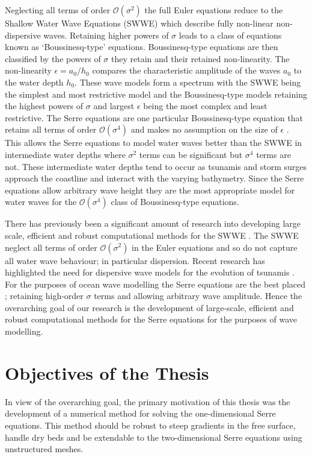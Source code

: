Neglecting all terms of order $\mathcal{O}\left(\sigma ^2\right)$ the full Euler equations reduce to the Shallow Water Wave Equations (SWWE) \cite{Bonneton-Lannes-2009-16601} which describe fully non-linear non-dispersive waves. Retaining higher powers of $\sigma$ leads to a class of equations known as `Boussinesq-type' equations. Boussinesq-type equations are then classified by the powers of $\sigma$ they retain and their retained non-linearity. The non-linearity $\epsilon= a_0 / h_0$ compares the characteristic amplitude of the waves $a_0$ to the water depth $h_0$. These wave models form a spectrum with the SWWE being the simplest and most restrictive model and the Boussinesq-type models retaining the highest powers of $\sigma$ and largest $\epsilon$ being the most complex and least restrictive. The Serre equations are one particular Boussinesq-type equation that retains all terms of order $\mathcal{O}\left(\sigma ^4\right)$ and makes no assumption on the size of $\epsilon$ \cite{Bonneton-Lannes-2009-16601}. This allows the Serre equations to model water waves better than the SWWE in intermediate water depths where $\sigma^2$ terms can be significant but $\sigma^4$ terms are not. These intermediate water depths tend to occur as tsunamis and storm surges approach the coastline and interact with the varying bathymetry. Since the Serre equations allow arbitrary wave height they are the most appropriate model for water waves for the $\mathcal{O}\left(\sigma ^4\right)$ class of Boussinesq-type equations. 

There has previously been a significant amount of research into developing large scale, efficient and robust computational methods for the SWWE \cite{ClawPack,Comcot,ANUGA}. The SWWE neglect all terms of order $\mathcal{O}\left(\sigma ^2\right)$ in the Euler equations and so do not capture all water wave behaviour; in particular dispersion. Recent research has highlighted the need for dispersive wave models for the evolution of tsunamis \cite{Grue-etal-2008-113,Kirby-etal-2013-39}. For the purposes of ocean wave modelling the Serre equations are the best placed \cite{Bonneton-Lannes-2009-16601}; retaining high-order $\sigma$ terms and allowing arbitrary wave amplitude. Hence the overarching goal of our research is the development of large-scale, efficient and robust computational methods for the Serre equations for the purposes of wave modelling.

\section{Objectives of the Thesis}
In view of the overarching goal, the primary motivation of this thesis was the development of a numerical method for solving the one-dimensional Serre equations. This method should be robust to steep gradients in the free surface, handle dry beds and be extendable to the two-dimensional Serre equations using unstructured meshes. 

